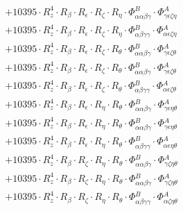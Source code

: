 \documentclass{article}
\begin{document}
\begin{subequations}
\begin{gather}
\begin{array}{c}
 \\[0.2em] 		 + 10395 \cdot R_{z}^{4} \cdot R_{\beta{}} \cdot R_{\epsilon{}} \cdot R_{\zeta{}} \cdot R_{\eta{}} \cdot \Phi{}^{B}_{\alpha{}\alpha{}\beta{}\gamma{}} \cdot \Phi{}^{A}_{\gamma{}\epsilon{}\zeta{}\eta{}} 
 \\[0.2em] 		 + 10395 \cdot R_{z}^{4} \cdot R_{\beta{}} \cdot R_{\epsilon{}} \cdot R_{\zeta{}} \cdot R_{\eta{}} \cdot \Phi{}^{B}_{\alpha{}\beta{}\gamma{}\gamma{}} \cdot \Phi{}^{A}_{\alpha{}\epsilon{}\zeta{}\eta{}} 
 \\[0.2em] 		 + 10395 \cdot R_{z}^{4} \cdot R_{\beta{}} \cdot R_{\epsilon{}} \cdot R_{\zeta{}} \cdot R_{\theta{}} \cdot \Phi{}^{B}_{\alpha{}\alpha{}\beta{}\gamma{}} \cdot \Phi{}^{A}_{\gamma{}\epsilon{}\zeta{}\theta{}} 
 \\[0.2em] 		 + 10395 \cdot R_{z}^{4} \cdot R_{\beta{}} \cdot R_{\epsilon{}} \cdot R_{\zeta{}} \cdot R_{\theta{}} \cdot \Phi{}^{B}_{\alpha{}\alpha{}\beta{}\gamma{}} \cdot \Phi{}^{A}_{\gamma{}\epsilon{}\zeta{}\theta{}} 
 \\[0.2em] 		 + 10395 \cdot R_{z}^{4} \cdot R_{\beta{}} \cdot R_{\epsilon{}} \cdot R_{\zeta{}} \cdot R_{\theta{}} \cdot \Phi{}^{B}_{\alpha{}\beta{}\gamma{}\gamma{}} \cdot \Phi{}^{A}_{\alpha{}\epsilon{}\zeta{}\theta{}} 
 \\[0.2em] 		 + 10395 \cdot R_{z}^{4} \cdot R_{\beta{}} \cdot R_{\epsilon{}} \cdot R_{\eta{}} \cdot R_{\theta{}} \cdot \Phi{}^{B}_{\alpha{}\alpha{}\beta{}\gamma{}} \cdot \Phi{}^{A}_{\gamma{}\epsilon{}\eta{}\theta{}} 
 \\[0.2em] 		 + 10395 \cdot R_{z}^{4} \cdot R_{\beta{}} \cdot R_{\epsilon{}} \cdot R_{\eta{}} \cdot R_{\theta{}} \cdot \Phi{}^{B}_{\alpha{}\alpha{}\beta{}\gamma{}} \cdot \Phi{}^{A}_{\gamma{}\epsilon{}\eta{}\theta{}} 
 \\[0.2em] 		 + 10395 \cdot R_{z}^{4} \cdot R_{\beta{}} \cdot R_{\epsilon{}} \cdot R_{\eta{}} \cdot R_{\theta{}} \cdot \Phi{}^{B}_{\alpha{}\beta{}\gamma{}\gamma{}} \cdot \Phi{}^{A}_{\alpha{}\epsilon{}\eta{}\theta{}} 
 \\[0.2em] 		 + 10395 \cdot R_{z}^{4} \cdot R_{\beta{}} \cdot R_{\zeta{}} \cdot R_{\eta{}} \cdot R_{\theta{}} \cdot \Phi{}^{B}_{\alpha{}\alpha{}\beta{}\gamma{}} \cdot \Phi{}^{A}_{\gamma{}\zeta{}\eta{}\theta{}} 
 \\[0.2em] 		 + 10395 \cdot R_{z}^{4} \cdot R_{\beta{}} \cdot R_{\zeta{}} \cdot R_{\eta{}} \cdot R_{\theta{}} \cdot \Phi{}^{B}_{\alpha{}\alpha{}\beta{}\gamma{}} \cdot \Phi{}^{A}_{\gamma{}\zeta{}\eta{}\theta{}} 
 \\[0.2em] 		 + 10395 \cdot R_{z}^{4} \cdot R_{\beta{}} \cdot R_{\zeta{}} \cdot R_{\eta{}} \cdot R_{\theta{}} \cdot \Phi{}^{B}_{\alpha{}\beta{}\gamma{}\gamma{}} \cdot \Phi{}^{A}_{\alpha{}\zeta{}\eta{}\theta{}} 

\end{array}
\end{gather}
\end{subequations}
\end{document}
